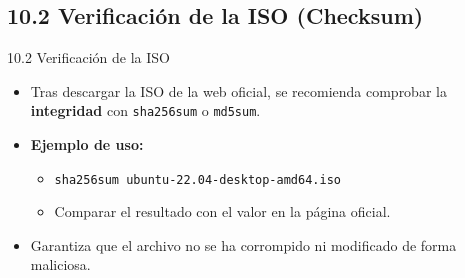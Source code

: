 \documentclass{beamer}
\begin{document}
\subsection{10.2 Verificación de la ISO (Checksum)}
\begin{frame}{10.2 Verificación de la ISO}
    \begin{itemize}
        \item Tras descargar la ISO de la web oficial, se recomienda comprobar la \textbf{integridad} con \texttt{sha256sum} o \texttt{md5sum}.
        \item \textbf{Ejemplo de uso:}  
        \begin{itemize}
            \item \texttt{sha256sum ubuntu-22.04-desktop-amd64.iso}
            \item Comparar el resultado con el valor en la página oficial.
        \end{itemize}
        \item Garantiza que el archivo no se ha corrompido ni modificado de forma maliciosa.
    \end{itemize}
\end{frame}
\end{document}
